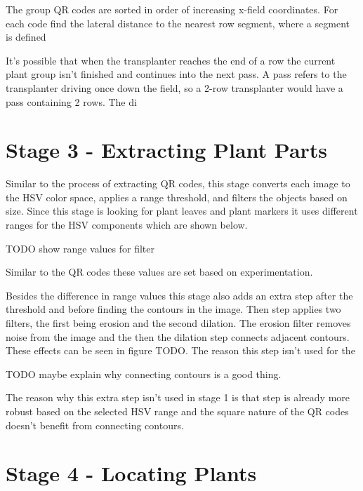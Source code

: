 The group QR codes are sorted in order of increasing x-field coordinates.  For each code find the lateral distance to the nearest row segment, where a segment is defined  




It's possible that when the transplanter reaches the end of a row the current plant group isn't finished and continues into the next pass.  A pass refers to the transplanter driving once down the field, so a 2-row transplanter would have a pass containing 2 rows.  The di


\section{Stage 3 - Extracting Plant Parts}
\label{processing-stage3}

Similar to the process of extracting QR codes, this stage converts each image to the HSV color space, applies a range threshold, and filters the objects based on size.  Since this stage is looking for plant leaves and plant markers it uses different ranges for the HSV components which are shown below.  

TODO show range values for filter

Similar to the QR codes these values are set based on experimentation.  

Besides the difference in range values this stage also adds an extra step after the threshold and before finding the contours in the image.  Then step applies two filters, the first being erosion and the second dilation.  The erosion filter removes noise from the image and the then the dilation step connects adjacent contours.  These effects can be seen in figure TODO.  The reason this step isn't used for the 

TODO maybe explain why connecting contours is a good thing.

The reason why this extra step isn't used in stage 1 is that step is already more robust based on the selected HSV range and the square nature of the QR codes doesn't benefit from connecting contours.   

\section{Stage 4 - Locating Plants}
\label{processing-stage4}

